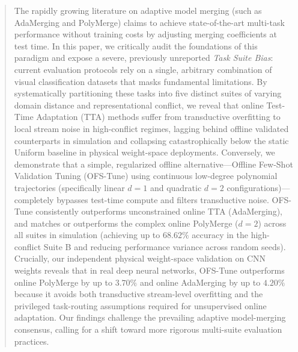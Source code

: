 \begin{abstract}
The rapidly growing literature on adaptive model merging (such as AdaMerging and PolyMerge) claims to achieve state-of-the-art multi-task performance without training costs by adjusting merging coefficients at test time.
In this paper, we critically audit the foundations of this paradigm and expose a severe, previously unreported \emph{Task Suite Bias}: current evaluation protocols rely on a single, arbitrary combination of visual classification datasets that masks fundamental limitations.
By systematically partitioning these tasks into five distinct suites of varying domain distance and representational conflict, we reveal that online Test-Time Adaptation (TTA) methods suffer from transductive overfitting to local stream noise in high-conflict regimes, lagging behind offline validated counterparts in simulation and collapsing catastrophically below the static Uniform baseline in physical weight-space deployments.
Conversely, we demonstrate that a simple, regularized offline alternative---Offline Few-Shot Validation Tuning (OFS-Tune) using continuous low-degree polynomial trajectories (specifically linear $d=1$ and quadratic $d=2$ configurations)---completely bypasses test-time compute and filters transductive noise.
OFS-Tune consistently outperforms unconstrained online TTA (AdaMerging), and matches or outperforms the complex online PolyMerge ($d=2$) across all suites in simulation (achieving up to $68.62\%$ accuracy in the high-conflict Suite B and reducing performance variance across random seeds).
Crucially, our independent physical weight-space validation on CNN weights reveals that in real deep neural networks, OFS-Tune outperforms online PolyMerge by up to $3.70\%$ and online AdaMerging by up to $4.20\%$ because it avoids both transductive stream-level overfitting and the privileged task-routing assumptions required for unsupervised online adaptation.
Our findings challenge the prevailing adaptive model-merging consensus, calling for a shift toward more rigorous multi-suite evaluation practices.
\end{abstract}
